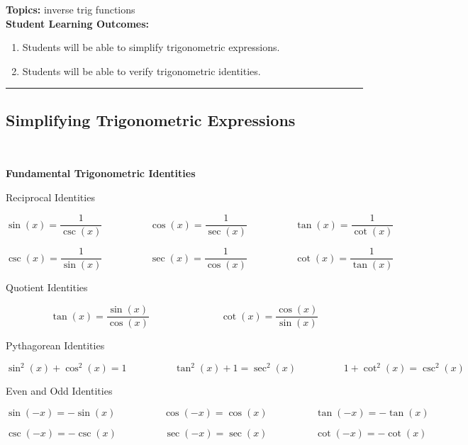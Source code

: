 

\noindent \textbf{Topics:}  inverse trig functions\\

\noindent \textbf{Student Learning Outcomes:}
\begin{enumerate}
\item Students will be able to simplify trigonometric expressions.
\item Students will be able to verify trigonometric identities.

\end{enumerate}

\hrule 

\bigskip

\subsection{Simplifying Trigonometric Expressions} ~

\begin{boxthm}
{\bf Fundamental Trigonometric Identities}

Reciprocal Identities

$$\sin(x) =\frac{1}{\csc(x)} \hspace{2cm}\cos(x) = \frac{1}{\sec(x)}\hspace{2cm}\tan(x) = \frac{1}{\cot(x)}$$

$$\csc(x) =\frac{1}{\sin(x)} \hspace{2cm}\sec(x) = \frac{1}{\cos(x)}\hspace{2cm}\cot(x) = \frac{1}{\tan(x)}$$

Quotient Identities

$$\tan(x) = \frac{\sin(x)}{\cos(x)} \hspace{3cm} \cot(x) = \frac{\cos(x)}{\sin(x)}$$

Pythagorean Identities

$$\sin^2(x) + \cos^2(x)=1 \hspace{2cm}\tan^2(x) +1 = \sec^2(x) \hspace{2cm}1+\cot^2(x) = \csc^2(x)$$

Even and Odd Identities

$$\sin( -x) =-\sin(x)\hspace{2cm}\cos( -x) = \cos(x)\hspace{2cm}\tan(- x) = -\tan(x)$$

$$\csc( -x) =-\csc(x)\hspace{2cm}\sec( -x) = \sec(x)\hspace{2cm}\cot(- x) = -\cot(x)$$

\end{boxthm}

